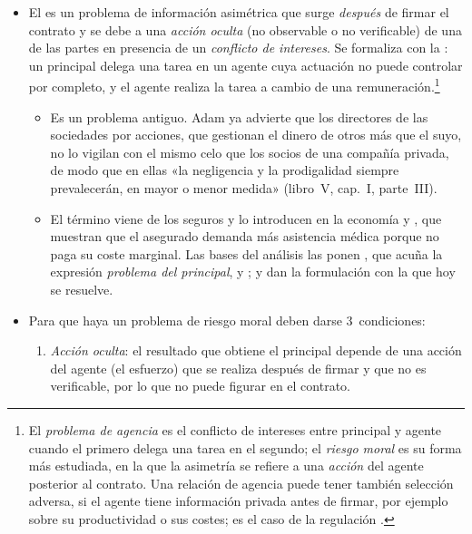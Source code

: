 \documentclass[11pt]{article}
\begin{document}
\begin{itemize}
\item El  es un problema de información asimétrica que surge \emph{después} de firmar el contrato y se debe a una \emph{acción oculta} (no observable o no verificable) de una de las partes en presencia de un \emph{conflicto de intereses}. Se formaliza con la : un principal delega una tarea en un agente cuya actuación no puede controlar por completo, y el agente realiza la tarea a cambio de una remuneración.\footnote{El \emph{problema de agencia} es el conflicto de intereses entre principal y agente cuando el primero delega una tarea en el segundo; el \emph{riesgo moral} es su forma más estudiada, en la que la asimetría se refiere a una \emph{acción} del agente posterior al contrato. Una relación de agencia puede tener también selección adversa, si el agente tiene información privada antes de firmar, por ejemplo sobre su productividad o sus costes; es el caso de la regulación .}
  \begin{itemize}
  \item Es un problema antiguo. Adam \textcite{Smith1776Wealth} ya advierte que los directores de las sociedades por acciones, que gestionan el dinero de otros más que el suyo, no lo vigilan con el mismo celo que los socios de una compañía privada, de modo que en ellas «la negligencia y la prodigalidad siempre prevalecerán, en mayor o menor medida» (libro~V, cap.~I, parte~III).
  \item El término viene de los seguros y lo introducen en la economía \textcite{Arrow1963Uncertainty} y \textcite{Pauly1968Economics}, que muestran que el asegurado demanda más asistencia médica porque no paga su coste marginal. Las bases del análisis las ponen \textcite{Ross1973Economic}, que acuña la expresión \emph{problema del principal}, \textcite{Mirrlees1974Notes} y \textcite{Stiglitz1974Incentives}; \textcite{Holmstrom1979Moral} y \textcite{GrossmanHart1983Analysis} dan la formulación con la que hoy se resuelve.
  \end{itemize}
\item Para que haya un problema de riesgo moral deben darse 3~condiciones:
  \begin{enumerate}[ref=\arabic*]
  \item\label{cond:rm-accion} \emph{Acción oculta}: el resultado que obtiene el principal depende de una acción del agente (el esfuerzo) que se realiza después de firmar y que no es verificable, por lo que no puede figurar en el contrato.

\end{enumerate}
\end{itemize}
\end{document}
